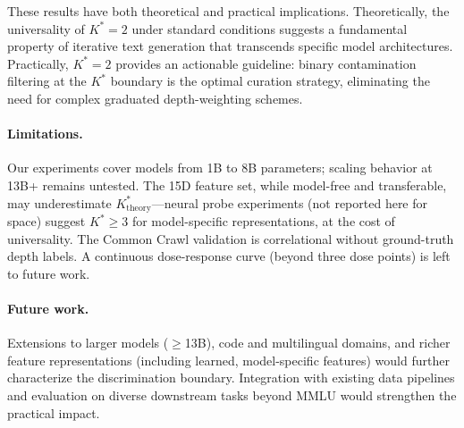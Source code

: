 \documentclass[11pt]{article}
\newcommand{\kstar}{K^{*}}
\begin{document}
These results have both theoretical and practical implications. Theoretically, the universality of $\kstar = 2$ under standard conditions suggests a fundamental property of iterative text generation that transcends specific model architectures. Practically, $\kstar = 2$ provides an actionable guideline: binary contamination filtering at the $\kstar$ boundary is the optimal curation strategy, eliminating the need for complex graduated depth-weighting schemes.

\paragraph{Limitations.} Our experiments cover models from 1B to 8B parameters; scaling behavior at 13B+ remains untested. The 15D feature set, while model-free and transferable, may underestimate $\kstar_{\text{theory}}$---neural probe experiments (not reported here for space) suggest $\kstar \geq 3$ for model-specific representations, at the cost of universality. The Common Crawl validation is correlational without ground-truth depth labels. A continuous dose-response curve (beyond three dose points) is left to future work.

\paragraph{Future work.} Extensions to larger models ($\geq$13B), code and multilingual domains, and richer feature representations (including learned, model-specific features) would further characterize the discrimination boundary. Integration with existing data pipelines and evaluation on diverse downstream tasks beyond MMLU would strengthen the practical impact.



\end{document}
